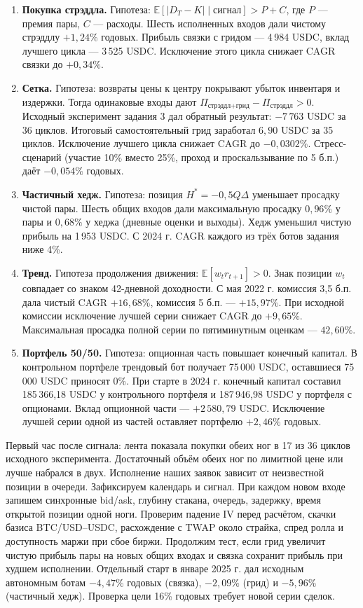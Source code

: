 \begin{enumerate}
\setlength{\itemsep}{6pt}\setlength{\parsep}{0pt}\setlength{\topsep}{3pt}
\item \textbf{Покупка стрэддла.} Гипотеза: $\mathbb E[|D_T-K|\mid\text{сигнал}]>P+C$, где $P$ --- премия пары, $C$ --- расходы. Шесть исполненных входов дали чистому стрэддлу $+1{,}24\%$ годовых. Прибыль связки с гридом --- 4\,984 USDC, вклад лучшего цикла --- 3\,525 USDC. Исключение этого цикла снижает CAGR связки до $+0{,}34\%$.
\item \textbf{Сетка.} Гипотеза: возвраты цены к центру покрывают убыток инвентаря и издержки. Тогда одинаковые входы дают $\Pi_{\text{стрэддл+грид}}-\Pi_{\text{стрэддл}}>0$. Исходный эксперимент задания 3 дал обратный результат: $-7\,763$ USDC за 36 циклов. Итоговый самостоятельный грид заработал $6{,}90$ USDC за 35 циклов. Исключение лучшего цикла снижает CAGR до $-0{,}0302\%$. Стресс-сценарий (участие 10\% вместо 25\%, проход и проскальзывание по 5 б.п.) даёт $-0{,}054\%$ годовых.
\item \textbf{Частичный хедж.} Гипотеза: позиция $H^*=-0{,}5Q\Delta$ уменьшает просадку чистой пары. Шесть общих входов дали максимальную просадку $0{,}96\%$ у пары и $0{,}68\%$ у хеджа (дневные оценки и выходы). Хедж уменьшил чистую прибыль на 1\,953 USDC. С 2024 г. CAGR каждого из трёх ботов задания ниже 4\%.
\item \textbf{Тренд.} Гипотеза продолжения движения: $\mathbb E[w_t r_{t+1}]>0$. Знак позиции $w_t$ совпадает со знаком 42-дневной доходности. С мая 2022 г. комиссия 3,5 б.п. дала чистый CAGR $+16{,}68\%$, комиссия 5 б.п. --- $+15{,}97\%$. При исходной комиссии исключение лучшей серии снижает CAGR до $+9{,}65\%$. Максимальная просадка полной серии по пятиминутным оценкам --- $42{,}60\%$.
\item \textbf{Портфель 50/50.} Гипотеза: опционная часть повышает конечный капитал. В контрольном портфеле трендовый бот получает 75\,000 USDC, оставшиеся 75\,000 USDC приносят 0\%. При старте в 2024 г. конечный капитал составил 185\,366,18 USDC у контрольного портфеля и 187\,946,98 USDC у портфеля с опционами. Вклад опционной части --- $+2\,580{,}79$ USDC. Исключение лучшей серии одной из частей оставляет портфелю $+2{,}46\%$ годовых.
\end{enumerate}
 Первый час после сигнала: лента показала покупки обеих ног в 17 из 36 циклов исходного эксперимента. Достаточный объём обеих ног по лимитной цене или лучше набрался в двух. Исполнение наших заявок зависит от неизвестной позиции в очереди. Зафиксируем календарь и сигнал. При каждом новом входе запишем синхронные bid/ask, глубину стакана, очередь, задержку, время открытой позиции одной ноги. Проверим падение IV перед расчётом, скачки базиса BTC/USD--USDC, расхождение с TWAP около страйка, спред ролла и доступность маржи при сбое биржи. Продолжим тест, если грид увеличит чистую прибыль пары на новых общих входах и связка сохранит прибыль при худшем исполнении. Отдельный старт в январе 2025 г. дал исходным автономным ботам $-4{,}47\%$ годовых (связка), $-2{,}09\%$ (грид) и $-5{,}96\%$ (частичный хедж). Проверка цели 16\% годовых требует новой серии сделок.

